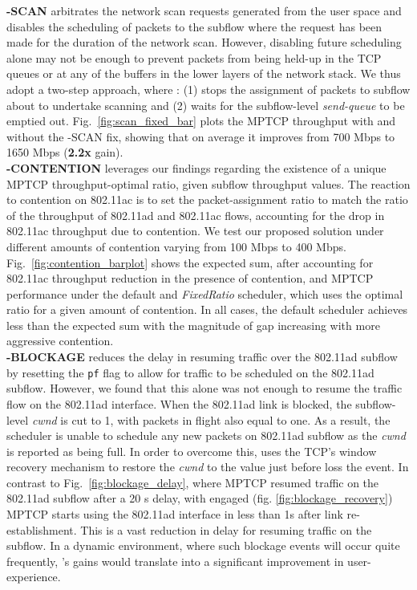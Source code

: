 \noindent\textbf{\name-SCAN} arbitrates the network scan requests generated
from the user space and disables the scheduling of packets to the
subflow where the request has been made for the duration of the
network scan. However, disabling future scheduling alone may not be
enough to prevent packets from being held-up in the TCP queues or at
any of the buffers in the lower layers of the network stack. We thus
adopt a two-step approach, where \name: (1) stops the assignment of
packets to subflow about to undertake scanning and (2) waits for the
subflow-level \emph{send-queue} to be emptied out. Fig.~\ref{fig:scan_fixed_bar}
plots the MPTCP throughput with and without the \name-SCAN fix,
showing that on average it improves from 700 Mbps to 1650 Mbps
(\textbf{2.2x} gain).
\\
\noindent\textbf{\name-CONTENTION} leverages our findings regarding the 
existence of a unique MPTCP throughput-optimal ratio, given subflow throughput values. The 
reaction to contention on 802.11ac is to set the packet-assignment ratio to match the ratio of
the throughput of 802.11ad and 802.11ac flows, accounting for the drop
in 802.11ac throughput due to contention. We test our proposed
solution under different amounts of contention varying from 100 Mbps
to 400 Mbps. Fig.~\ref{fig:contention_barplot} shows the expected sum,
after accounting for 802.11ac throughput reduction in the presence of
contention, and MPTCP performance under the default
and \emph{FixedRatio} scheduler, which uses the optimal ratio for a
given amount of contention. In all cases, the default scheduler
achieves less than the expected sum with the magnitude of gap
increasing with more aggressive contention.
\\
\noindent\textbf{\name-BLOCKAGE} reduces the delay in resuming traffic over the 802.11ad
subflow by resetting the {{\tt pf}} flag to allow for traffic to be
scheduled on the 802.11ad subflow. However, we found that this alone
was not enough to resume the traffic flow on the 802.11ad
interface. When the 802.11ad link is blocked, the
subflow-level \emph{cwnd} is cut to 1, with packets in flight also
equal to one. As a result, the scheduler is unable to schedule any new
packets on 802.11ad subflow as the \emph{cwnd} is reported as being
full. In order to overcome this, \name uses the TCP's window recovery
mechanism to restore the \emph{cwnd} to the value just before loss the
event. In contrast to Fig.~\ref{fig:blockage_delay}, where MPTCP resumed traffic on the
802.11ad subflow after a 20 s delay, with \name engaged (fig. \ref{fig:blockage_recovery}) 
MPTCP starts using the 802.11ad interface in less than 1s after link re-establishment. This
is a vast reduction in delay for resuming traffic on the subflow. In a
dynamic environment, where such blockage events will occur quite
frequently, \name's gains would translate into a significant
improvement in user-experience.

